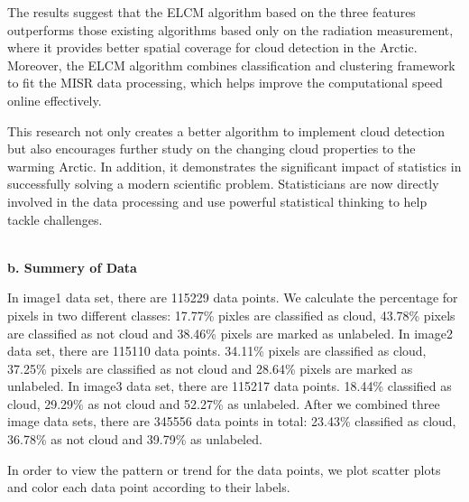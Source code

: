 \documentclass[11pt]{article}
\begin{document}
The results suggest that the ELCM algorithm based on the three features outperforms those existing algorithms based only on the radiation measurement, where it provides better spatial coverage for cloud detection in the Arctic. Moreover, the ELCM algorithm combines classification and clustering framework to fit the MISR data processing, which helps improve the computational speed online effectively. 

This research not only creates a better algorithm to implement cloud detection but also encourages further study on the changing cloud properties to the warming Arctic. In addition, it demonstrates the significant impact of statistics in successfully solving a modern scientific problem. Statisticians are now directly involved in the data processing and use powerful statistical thinking to help tackle challenges. \par

\vspace{0.3cm}
\mbox{}\\
\textbf{b. Summery of Data}

In image1 data set, there are 115229 data points. We calculate the percentage for pixels in two different classes: 17.77\% pixles are classified as cloud, 43.78\% pixels are classified as not cloud and 38.46\% pixels are marked as unlabeled. In image2 data set, there are 115110 data points. 34.11\% pixels are classified as cloud, 37.25\% pixels are classified as not cloud and 28.64\% pixels are marked as unlabeled. In image3 data set, there are 115217 data points. 18.44\% classified as cloud, 29.29\% as not cloud and 52.27\% as unlabeled. After we combined three image data sets, there are 345556 data points in total: 23.43\% classified as cloud, 36.78\% as not cloud and 39.79\% as unlabeled. 

In order to view the pattern or trend for the data points, we plot scatter plots and color each data point according to their labels. 
\end{document}

